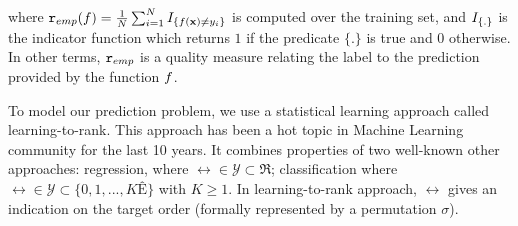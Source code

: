 \noindent
where ${\tt r}_{emp}(f) = \frac{1}{N} \sum_{i=1}^N I_{\left \{ f({\bf x}) \neq y_i \right \}}$ is computed over the training set, and $I_{\left \{ . \right \}}$ is the indicator function which returns $1$ if the predicate $\{.\}$ is true and $0$ otherwise. In other terms, ${\tt r}_{emp}$ is a quality measure relating the label to the prediction provided by the function $f$.

To model our prediction problem, we use a statistical learning approach called learning-to-rank. This approach has been a hot topic in Machine Learning community for the last 10 years. It combines properties of two well-known other approaches: regression, where $\rel \in \mathcal{Y}  \subset \Re$; classification where $\rel \in \mathcal{Y}  \subset \{0,1, ..., KÊ\}$ with $K \geq 1$. In learning-to-rank approach, $\rel$ gives an indication on the target order (formally represented by a permutation $\sigma$). 

%
%
%
%


